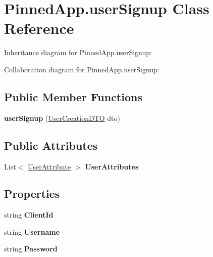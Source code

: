 \hypertarget{class_pinned_app_1_1user_signup}{}\section{Pinned\+App.\+user\+Signup Class Reference}
\label{class_pinned_app_1_1user_signup}


Inheritance diagram for Pinned\+App.\+user\+Signup\+:


Collaboration diagram for Pinned\+App.\+user\+Signup\+:
\subsection*{Public Member Functions}
\begin{DoxyCompactItemize}
\item 
\mbox{\label{class_pinned_app_1_1user_signup_a0678dedb89c0ef064b0605bd807e6884}} 
{\bfseries user\+Signup} (\hyperlink{class_pinned_app_1_1_user_creation_d_t_o}{User\+Creation\+D\+TO} dto)
\end{DoxyCompactItemize}
\subsection*{Public Attributes}
\begin{DoxyCompactItemize}
\item 
\mbox{\label{class_pinned_app_1_1user_signup_ab4b8e886c56b2b41ff6459ed67605aca}} 
List$<$ \hyperlink{class_pinned_app_1_1_user_attribute}{User\+Attribute} $>$ {\bfseries User\+Attributes}
\end{DoxyCompactItemize}
\subsection*{Properties}
\begin{DoxyCompactItemize}
\item 
\mbox{\label{class_pinned_app_1_1user_signup_a0709a5154b6e193d6dcdc314d4768a09}} 
string {\bfseries Client\+Id}
\item 
\mbox{\label{class_pinned_app_1_1user_signup_ac9eda5b4a5b5c8ac375e0b150168f3f5}} 
string {\bfseries Username}
\item 
\mbox{\label{class_pinned_app_1_1user_signup_a177d45dfbfc83fdbe67ca86db4a61e13}} 
string {\bfseries Password}
\end{DoxyCompactItemize}


